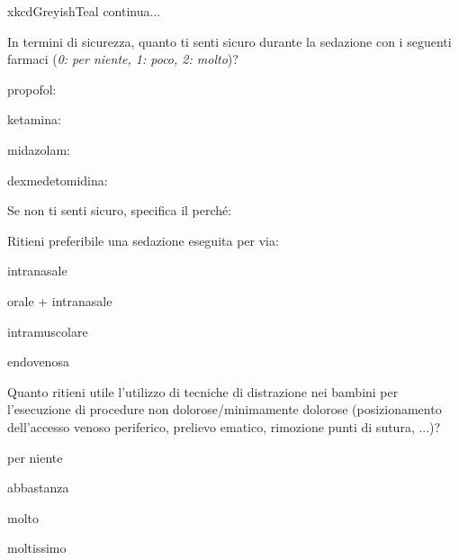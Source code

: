 \begin{survey}{xkcdGreyishTeal}
      \hfill continua...
       
       \newpage
       
       \Query In termini di sicurezza, quanto ti senti sicuro durante la sedazione con i seguenti farmaci (\emph{0: per niente, 1: poco, 2: molto})?
       
           propofol: \hfill {}
           
           ketamina: \hfill {}
           
           midazolam: \hfill {}
           
           dexmedetomidina: \hfill {}
    
       \bigskip 
       Se non ti senti sicuro, specifica il perché:
       
       \Query Ritieni preferibile una sedazione eseguita per via:
       \begin{Qlist}
           \item intranasale
           \item orale + intranasale
           \item intramuscolare
           \item endovenosa
       \end{Qlist}
       
       \bigskip
       
     

       

       \Query Quanto ritieni utile l’utilizzo di tecniche di distrazione nei bambini per l’esecuzione di procedure non dolorose/minimamente dolorose (posizionamento dell'accesso venoso periferico, prelievo ematico, rimozione punti di sutura, ...)?
       \begin{Qlist}
           \item per niente
           \item abbastanza
           \item molto
           \item moltissimo
       \end{Qlist}
       

\end{survey}
